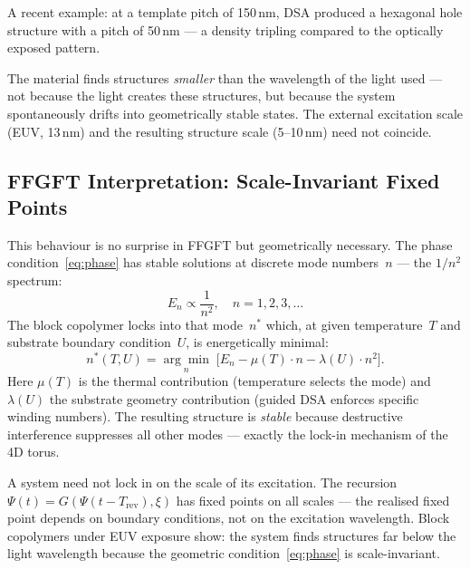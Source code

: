 \noindent A recent example: at a template pitch of 150\,nm,
DSA produced a hexagonal hole structure with a pitch of 50\,nm —
a density tripling compared to the optically exposed pattern.

\begin{warnbox}
The material finds structures \emph{smaller} than the wavelength of
the light used — not because the light creates these structures, but
because the system spontaneously drifts into geometrically stable
states. The external excitation scale (EUV, 13\,nm) and the resulting
structure scale (5--10\,nm) need not coincide.
\end{warnbox}

\subsection{FFGFT Interpretation: Scale-Invariant Fixed Points}

This behaviour is no surprise in FFGFT but geometrically necessary.
The phase condition~\eqref{eq:phase} has stable solutions at discrete
mode numbers~$n$ — the $1/n^2$ spectrum:
\begin{equation}
  E_n \propto \frac{1}{n^2}, \quad n = 1, 2, 3, \ldots
\end{equation}
The block copolymer locks into that mode~$n^*$ which, at given
temperature~$T$ and substrate boundary condition~$U$, is energetically
minimal:
\begin{equation}
  n^*(T, U) = \underset{n}{\arg\min}\;
    \bigl[ E_n - \mu(T)\cdot n - \lambda(U)\cdot n^2 \bigr].
\end{equation}
Here $\mu(T)$ is the thermal contribution (temperature selects the mode)
and $\lambda(U)$ the substrate geometry contribution (guided DSA
enforces specific winding numbers). The resulting structure is
\emph{stable} because destructive interference suppresses all other
modes — exactly the lock-in mechanism of the 4D torus.

\begin{keybox}
A system need not lock in on the scale of its excitation.
The recursion $\Psi(t) = G(\Psi(t - T_{\text{rev}}), \xi)$ has
fixed points on all scales — the realised fixed point depends on
boundary conditions, not on the excitation wavelength.
Block copolymers under EUV exposure show: the system finds
structures far below the light wavelength because the
geometric condition~\eqref{eq:phase} is scale-invariant.
\end{keybox}

